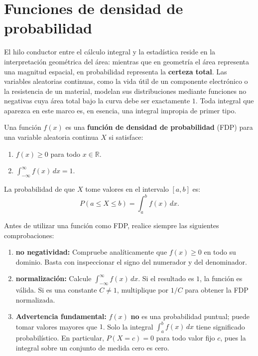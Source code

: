 \section{Funciones de densidad de probabilidad}

El hilo conductor entre el cálculo integral y la estadística reside en la interpretación
geométrica del área: mientras que en geometría el área representa una magnitud espacial, en
probabilidad representa la \textbf{certeza total}. Las variables aleatorias continuas, como la vida
útil de un componente electrónico o la resistencia de un material, modelan sus distribuciones
mediante funciones no negativas cuya área total bajo la curva debe ser exactamente $1$. Toda
integral que aparezca en este marco es, en esencia, una integral impropia de primer tipo.

\begin{definition}
Una función $f(x)$ es una \textbf{función de densidad de probabilidad} (FDP) para una variable
aleatoria continua $X$ si satisface:
\begin{enumerate}
    \item $f(x)\geq 0$ para todo $x\in\mathbb{R}$.
    \item $\displaystyle\int_{-\infty}^{\infty} f(x)\,dx = 1$.
\end{enumerate}
La probabilidad de que $X$ tome valores en el intervalo $[a,b]$ es:
\[
  P(a\leq X\leq b) = \int_{a}^{b} f(x)\,dx.
\]
\end{definition}

\begin{rem} 
Antes de utilizar una función como FDP, realice siempre las siguientes comprobaciones:
\begin{enumerate}
 \item \textbf{no negatividad:}
          Compruebe analíticamente que $f(x)\geq 0$ en todo su dominio. Basta con inspeccionar el
          signo del numerador y del denominador.
    \item \textbf{normalización:}
          Calcule $\int_{-\infty}^{\infty}f(x)\,dx$. Si el resultado es $1$, la función es válida.
          Si es una constante $C\neq 1$, multiplique por $1/C$ para obtener la FDP normalizada.
    \item \textbf{Advertencia fundamental:}
          $f(x)$ \textbf{no} es una probabilidad puntual; puede tomar valores mayores que $1$.
          Solo la integral $\int_a^b f(x)\,dx$ tiene significado probabilístico. En particular,
          $P(X=c)=0$ para todo valor fijo $c$, pues la integral sobre un conjunto de medida cero
          es cero.
\end{enumerate}
   

\end{rem}

